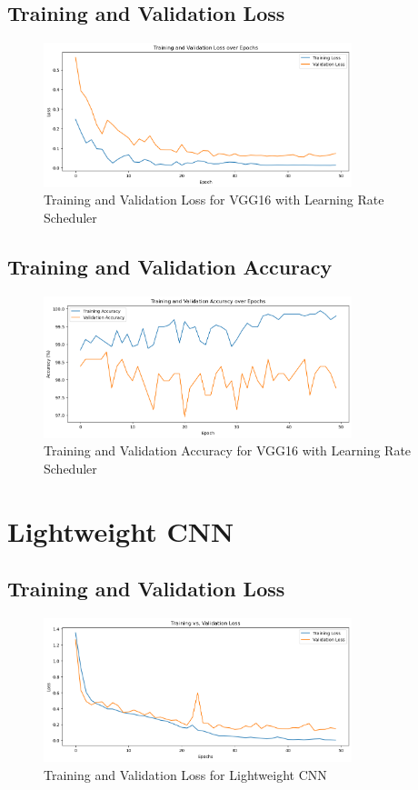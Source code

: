 \documentclass{report} %
\begin{document}
\subsection{Training and Validation Loss}

\begin{figure}[H]
\centering
\includegraphics[width=0.8\textwidth]{train_val_err_vgg16.png}
\caption{Training and Validation Loss for VGG16 with Learning Rate Scheduler}
\end{figure}


\subsection{Training and Validation Accuracy}

\begin{figure}[H]
\centering
\includegraphics[width=0.8\textwidth]{train_val_acc_vgg16.png}
\caption{Training and Validation Accuracy for VGG16 with Learning Rate Scheduler}
\end{figure}


\section{Lightweight CNN}

\subsection{Training and Validation Loss}

\begin{figure}[H]
\centering
\includegraphics[width=0.8\textwidth]{train_valid_err_cnn.png}
\caption{Training and Validation Loss for Lightweight CNN}
\end{figure}
\end{document}
